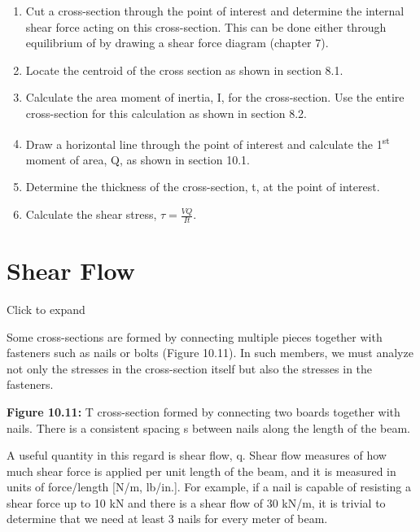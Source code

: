 \documentclass[
  letterpaper,
  DIV=11,
  numbers=noendperiod]{scrreprt}
\providecommand{\tightlist}{%
  \setlength{\itemsep}{0pt}\setlength{\parskip}{0pt}}\usepackage{longtable,booktabs,array}
\begin{document}
\begin{tcolorbox}[enhanced jigsaw, breakable, opacityback=0, toptitle=1mm, left=2mm, colback=white, opacitybacktitle=0.6, colframe=quarto-callout-warning-color-frame, titlerule=0mm, arc=.35mm, leftrule=.75mm, bottomtitle=1mm, colbacktitle=quarto-callout-warning-color!10!white, rightrule=.15mm, title={Step-by-step: Shear stress}, bottomrule=.15mm, toprule=.15mm, coltitle=black]

\begin{enumerate}
\def\labelenumi{\arabic{enumi}.}
\tightlist
\item
  Cut a cross-section through the point of interest and determine the
  internal shear force acting on this cross-section. This can be done
  either through equilibrium of by drawing a shear force diagram
  (chapter 7).
\item
  Locate the centroid of the cross section as shown in section 8.1.
\item
  Calculate the area moment of inertia, I, for the cross-section. Use
  the entire cross-section for this calculation as shown in section 8.2.
\item
  Draw a horizontal line through the point of interest and calculate the
  1\textsuperscript{st} moment of area, Q, as shown in section 10.1.
\item
  Determine the thickness of the cross-section, t, at the point of
  interest.
\item
  Calculate the shear stress, \(\tau=\frac{VQ}{It}\).
\end{enumerate}

\end{tcolorbox}

\section{Shear Flow}\label{sec-10.3}

Click to expand

Some cross-sections are formed by connecting multiple pieces together
with fasteners such as nails or bolts (Figure 10.11). In such members,
we must analyze not only the stresses in the cross-section itself but
also the stresses in the fasteners.

\textbf{Figure 10.11:} T cross-section formed by connecting two boards
together with nails. There is a consistent spacing s between nails along
the length of the beam.

A useful quantity in this regard is shear flow, q. Shear flow measures
of how much shear force is applied per unit length of the beam, and it
is measured in units of force/length {[}N/m, lb/in.{]}. For example, if
a nail is capable of resisting a shear force up to 10 kN and there is a
shear flow of 30 kN/m, it is trivial to determine that we need at least
3 nails for every meter of beam.
\end{document}

